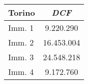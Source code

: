 \begin{tabular}[c]{|l||c|}
\hline
{\bfseries Torino} & {\bfseries \textit{DCF}} \\
\hline \hline
Imm. 1 & 9.220.290 \\
\hline
Imm. 2 & 16.453.004 \\
\hline
Imm. 3 & 24.548.218 \\
\hline
Imm. 4 & 9.172.760 \\
\hline
\end{tabular} 